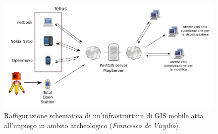 \documentclass{paper}
\begin{document}
	\begin{center}
	  \begin{figure}
	   \begin{center}
	    \includegraphics[scale=0.6]{img/schematellus.png}
	   \end{center}
	  \caption{\small{Raffigurazione schematica di un'infrastruttura
	 		di GIS mobile atta all'impiego in ambito archeologico (\emph{Francesco de Virgilio}).}}
	  \label{fig:schema_tellus}
	 \end{figure}
	\end{center}
\end{document}
